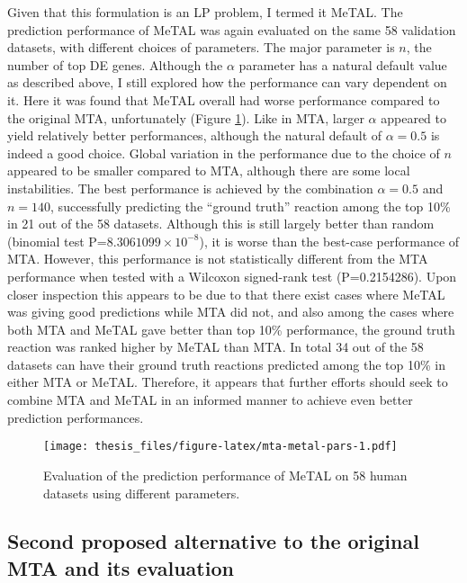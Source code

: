 \documentclass[12pt,twoside,openany,\mydriver]{thesis}  %
\begin{document}
Given that this formulation is an LP problem, I termed it MeTAL. The prediction performance of MeTAL was again evaluated on the same 58 validation datasets, with different choices of parameters. The major parameter is \(n\), the number of top DE genes. Although the \(\alpha\) parameter has a natural default value as described above, I still explored how the performance can vary dependent on it. Here it was found that MeTAL overall had worse performance compared to the original MTA, unfortunately (Figure \ref{fig:mta-metal-pars}). Like in MTA, larger \(\alpha\) appeared to yield relatively better performances, although the natural default of \(\alpha=0.5\) is indeed a good choice. Global variation in the performance due to the choice of \(n\) appeared to be smaller compared to MTA, although there are some local instabilities. The best performance is achieved by the combination \(\alpha=0.5\) and \(n=140\), successfully predicting the ``ground truth'' reaction among the top 10\% in 21 out of the 58 datasets. Although this is still largely better than random (binomial test P=\ensuremath{8.3061099\times 10^{-8}}), it is worse than the best-case performance of MTA. However, this performance is not statistically different from the MTA performance when tested with a Wilcoxon signed-rank test (P=0.2154286). Upon closer inspection this appears to be due to that there exist cases where MeTAL was giving good predictions while MTA did not, and also among the cases where both MTA and MeTAL gave better than top 10\% performance, the ground truth reaction was ranked higher by MeTAL than MTA. In total 34 out of the 58 datasets can have their ground truth reactions predicted among the top 10\% in either MTA or MeTAL. Therefore, it appears that further efforts should seek to combine MTA and MeTAL in an informed manner to achieve even better prediction performances.
\begin{figure}
\centering
\texttt{[image: thesis\_files/figure-latex/mta-metal-pars-1.pdf]}
\caption{\label{fig:mta-metal-pars}Evaluation of the prediction performance of MeTAL on 58 human datasets using different parameters.}
\end{figure}
\hypertarget{second-proposed-alternative-to-the-original-mta-and-its-evaluation}{%
\subsection{Second proposed alternative to the original MTA and its evaluation}\label{second-proposed-alternative-to-the-original-mta-and-its-evaluation}}
\end{document}
